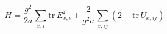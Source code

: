 \begin{equation}
H = \frac{g^2}{2a} \sum_{x,i} \mathrm{tr}\, E_{x,i}^2
  + \frac{2}{g^2a} \sum_{x,ij} (2 - \mathrm{tr}\, U_{x,ij})
\label{eq28}
\end{equation}

